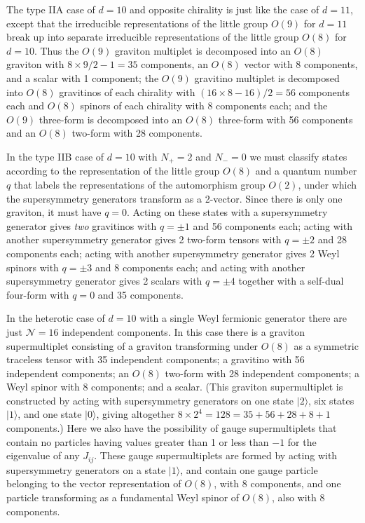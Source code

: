 The type IIA case of \(d=10\) and opposite chirality is just like the
case of \(d=11\), except that the irreducible representations of the
little group \(O(9)\) for \(d=11\) break up into separate irreducible
representations of the little group \(O(8)\) for \(d=10\). Thus the
\(O(9)\) graviton multiplet is decomposed into an \(O(8)\) graviton with
\(8\times9/2-1=35\) components, an \(O(8)\) vector with 8 components,
and a scalar with 1 component; the \(O(9)\) gravitino multiplet is
decomposed into \(O(8)\) gravitinos of each chirality with
\((16\times8-16)/2=56\) components each and \(O(8)\) spinors of each
chirality with 8 components each; and the \(O(9)\) three-form is
decomposed into an \(O(8)\) three-form with 56 components and an \(O(8)\)
two-form with 28 components.

In the type IIB case of \(d=10\) with \(N_+=2\) and \(N_-=0\) we must
classify states according to the representation of the little group
\(O(8)\) and a quantum number \(q\) that labels the representations of
the automorphism group \(O(2)\), under which the supersymmetry generators
transform as a 2-vector. Since there is only one graviton, it must have
\(q=0\). Acting on these states with a supersymmetry generator gives
\emph{two} gravitinos with \(q=\pm1\) and 56 components each; acting with
another supersymmetry generator gives 2 two-form tensors with \(q=\pm2\)
and 28 components each; acting with another supersymmetry generator gives
2 Weyl spinors with \(q=\pm3\) and 8 components each; and acting with
another supersymmetry generator gives 2 scalars with \(q=\pm4\) together
with a self-dual four-form with \(q=0\) and 35 components.

In the heterotic case of \(d=10\) with a single Weyl fermionic generator
there are just \(\mathcal N=16\) independent components. In this case
there is a graviton supermultiplet consisting of a graviton transforming
under \(O(8)\) as a symmetric traceless tensor with 35 independent
components; a gravitino with 56 independent components; an \(O(8)\)
two-form with 28 independent components; a Weyl spinor with 8 components;
and a scalar. (This graviton supermultiplet is constructed by acting with
supersymmetry generators on one state \(\lvert2\rangle\), six states
\(\lvert1\rangle\), and one state \(\lvert0\rangle\), giving altogether
\(8\times2^4=128=35+56+28+8+1\) components.) Here we also have the
possibility of gauge supermultiplets that contain no particles having
values greater than 1 or less than \(-1\) for the eigenvalue of any
\(J_{ij}\). These gauge supermultiplets are formed by acting with
supersymmetry generators on a state \(\lvert1\rangle\), and contain one
gauge particle belonging to the vector representation of \(O(8)\), with
8 components, and one particle transforming as a fundamental Weyl spinor
of \(O(8)\), also with 8 components.
